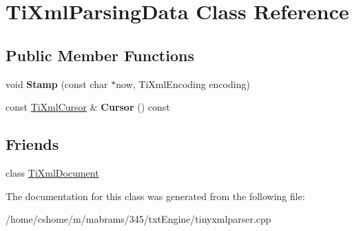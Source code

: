 \hypertarget{class_ti_xml_parsing_data}{
\section{TiXmlParsingData Class Reference}
\label{class_ti_xml_parsing_data}
}
\subsection*{Public Member Functions}
\begin{DoxyCompactItemize}
\item 
\hypertarget{class_ti_xml_parsing_data_a65cee8ab77a36c605db08c84b4c30a7d}{
void {\bfseries Stamp} (const char $\ast$now, TiXmlEncoding encoding)}
\label{class_ti_xml_parsing_data_a65cee8ab77a36c605db08c84b4c30a7d}

\item 
\hypertarget{class_ti_xml_parsing_data_a9e63d965fdb53ff4ac711e105269e918}{
const \hyperlink{struct_ti_xml_cursor}{TiXmlCursor} \& {\bfseries Cursor} () const }
\label{class_ti_xml_parsing_data_a9e63d965fdb53ff4ac711e105269e918}

\end{DoxyCompactItemize}
\subsection*{Friends}
\begin{DoxyCompactItemize}
\item 
\hypertarget{class_ti_xml_parsing_data_a173617f6dfe902cf484ce5552b950475}{
class \hyperlink{class_ti_xml_parsing_data_a173617f6dfe902cf484ce5552b950475}{TiXmlDocument}}
\label{class_ti_xml_parsing_data_a173617f6dfe902cf484ce5552b950475}

\end{DoxyCompactItemize}


The documentation for this class was generated from the following file:\begin{DoxyCompactItemize}
\item 
/home/cshome/m/mabrams/345/txtEngine/tinyxmlparser.cpp\end{DoxyCompactItemize}
